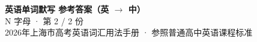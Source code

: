 \documentclass[10pt,a4paper]{article}
\begin{document}
\pagestyle{plain}

\begin{center}
{\LARGE\bfseries 英语单词默写 \quad 参考答案（英 $\to$ 中）}\\[0.22em]
{\large N 字母 · 第 2 / 2 份}\\[0.18em]
{\small 2026年上海市高考英语词汇用法手册 · 参照普通高中英语课程标准}
\end{center}

\vspace{0.2em}
\noindent{\color{rulegray}\rule{\textwidth}{0.8pt}}

\vspace{0.35em}

\vspace{0.25em}
\renewcommand{\arraystretch}{1.32}
\end{document}
